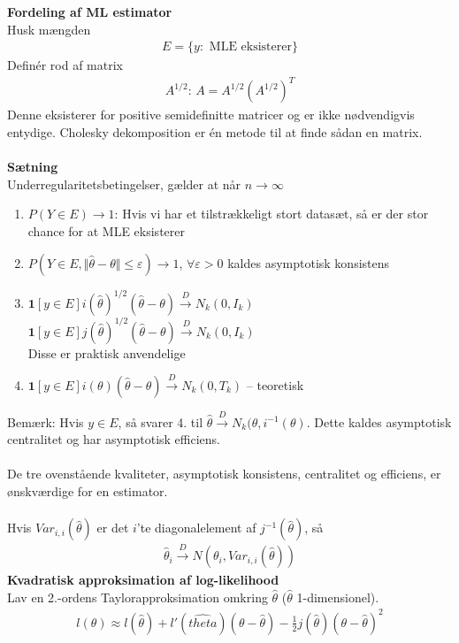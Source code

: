\documentclass[12pt,a4paper]{report}
\author{Frederik Appel Vardinghus-Nielsen}
\begin{document}
\noindent\textbf{Fordeling af ML estimator}\\
Husk mængden
\begin{align*}
E=\{y:\text{ MLE eksisterer}\}
\end{align*}
Definér rod af matrix
\begin{align*}
A^{1/2}:\,A=A^{1/2}(A^{1/2})^T
\end{align*}
Denne eksisterer for positive semidefinitte matricer og er ikke nødvendigvis entydige. Cholesky dekomposition er én metode til at finde sådan en matrix.\\\\
\textbf{Sætning}\\
Underregularitetsbetingelser, gælder at når $n\to\infty$
\begin{enumerate}
\item $P(Y\in E)\to1$: Hvis vi har et tilstrækkeligt stort datasæt, så er der stor chance for at MLE eksisterer
\item $P(Y\in E,\Vert\hat{\theta}-\theta\Vert\leq\varepsilon)\to1$, $\forall\varepsilon>0$ kaldes asymptotisk konsistens
\item $\mathbf{1}[y\in E]i(\hat{\theta})^{1/2}(\hat{\theta}-\theta)\overset{D}\to N_k(0,I_k)$\\
$\mathbf{1}[y\in E]j(\hat{\theta})^{1/2}(\hat{\theta}-\theta)\overset{D}\to N_k(0,I_k)$\\
Disse er praktisk anvendelige
\item $\mathbf{1}[y\in E]i(\theta)(\hat{\theta}-\theta)\overset{D}\to N_k(0,T_k)$ -- teoretisk
\end{enumerate}
Bemærk: Hvis $y\in E$, så svarer 4. til $\hat{\theta}\overset{D}\to N_k(\theta,i^{-1}(\theta)$. Dette kaldes asymptotisk centralitet og har asymptotisk efficiens.\\\\
De tre ovenstående kvaliteter, asymptotisk konsistens, centralitet og efficiens, er ønskværdige for en estimator.\\\\
Hvis $Var_{i,i}(\hat{\theta})$ er det $i$'te diagonalelement af $j^{-1}(\hat{\theta})$, så
\begin{align*}
\hat{\theta}_i\overset{D}\to N(\theta_i,Var_{i,i}(\hat{\theta}))
\end{align*}
\textbf{Kvadratisk approksimation af log-likelihood}\\
Lav en 2.-ordens Taylorapproksimation omkring $\hat{\theta}$ ($\hat{\theta}$ 1-dimensionel).
\begin{align*}
l(\theta)\approx l(\hat{\theta})+l'(\hat{theta})(\theta-\hat{\theta})-\frac{1}{2}j(\hat{\theta})(\theta-\hat{\theta})^2
\end{align*}
\end{document}

